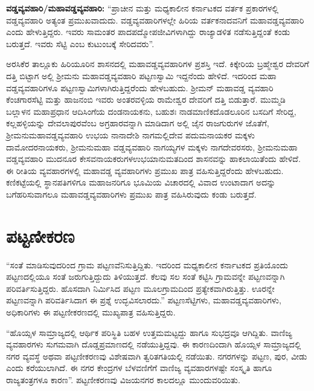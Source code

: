 \textbf{ವಡ್ಡವ್ಯವಹಾರಿ/ಮಹಾವಡ್ಡವ್ಯವಹಾರಿ:} “ಪ್ರಾಚೀನ ಮತ್ತು ಮಧ್ಯಕಾಲೀನ ಕರ್ನಾಟಕದ ವರ್ತಕ ಪ್ರಕಾರಗಳಲ್ಲಿ ವಡ್ಡವ್ಯವಹಾರಿ ಅತ್ಯಂತ ಪ್ರಮುಖವಾದುದು. ವಡ್ಡವ್ಯವಹಾರಿಗಳಲ್ಲೇ ಹಿರಿಯ ವರ್ತಕನಾದವನಿಗೆ ಮಹಾವಡ್ಡವ್ಯವಹಾರಿ ಎಂದು ಹೇಳುತ್ತಿದ್ದರು. ಇವರು ಸಾಮಂತರ ಪಾದಪದ್ಮೋಪಜೀವಿಗಳಾಗಿದ್ದು ರಾಜ್ಯಾಡಳಿತ ನಡೆಸುತ್ತಿದ್ದಂತೆ ಕಂಡು ಬರುತ್ತದೆ. ಇವರು ಸೆಟ್ಟಿ ಎಂಬ ಕುಟುಂಬಕ್ಕೆ ಸೇರಿದವರು”.

ಅರಸಿಕೆರ ತಾಲ್ಲೂಕು ಹಿರಿಯೂರಿನ ಶಾಸನದಲ್ಲಿ ಮಹಾವಡ್ಡವ್ಯವಹಾರಿಗಳ ಪ್ರಶಸ್ತಿ ಇದೆ. ಕಿಕ್ಕೇರಿಯ ಬ್ರಹ್ಮೇಶ್ವರ ದೇವರಿಗೆ ದತ್ತಿ ಬಿಟ್ಟಾಗ ಅಲ್ಲಿ ಶ‍್ರೀಮನು ಮಹಾವಡ್ಡವ್ಯವಹಾರಿ ಪಟ್ಟಣಸ್ವಾಮಿ ಇದ್ದನೆಂದು ಹೇಳಿದೆ. ಇದರಿಂದ ಮಹಾ ವಡ್ಡವ್ಯವಹಾರಿಗಳೂ ಪಟ್ಟಣಸ್ವಾಮಿಗಳಾಗಿರುತ್ತಿದ್ದರೆಂದು ಹೇಳಬಹುದು. ಶ‍್ರೀಮನ್​ ಮಹಾವಡ್ಡ ವ್ಯವಹಾರಿ ಕೆಂಚಗಾರಸೆಟ್ಟಿ ಮತ್ತು ಹಾಜನಂಬಿ ಇವರು ಅಂತರವಳ್ಳಿಯ ರಾಮೇಶ್ವರ ದೇವರಿಗೆ ದತ್ತಿ ಬಿಡುತ್ತಾರೆ. ಮುಮ್ಮಡಿ ಬಲ್ಲಾಳನ ಮಹಾಪ್ರಧಾನ ಆದಿಸಿಂಗೆಯ ದಂಡನಾಯಕನು, ಬಹುಶಃ ನಾಡಮಾಣಿಕದೊಡಲೂರಿನ ಬಸದಿಗೆ ಸೇರಿದ್ದ, ಕಲ್ಲಹಳ್ಳಿಯನ್ನು ದೇವಲಾಪುರವೆಂಬ ಅಗ್ರಹಾರವನ್ನಾಗಿ ಮಾಡಿದಾಗ ಅಲ್ಲಿ ಜೈನ ರಾಜಗುರುಗಳ ಜೊತೆಗೆ, ಶ‍್ರೀಮನುಮಹಾವಡ್ಡವ್ಯವಹಾರಿ ಉಭಯ ನಾನಾದೇಶಿ ನಾಗಮಲ್ಲಿದೇವ ಪದುಮನಾಯಕರ ಮಕ್ಕಳು ದಾಮೋದರನಾಯಕರು, ಶ‍್ರೀಮನುಮಹಾ ವಡ್ಡವ್ಯವಹಾರಿ ನಾಗಯ್ಯಗಳ ಮಕ್ಕಳು ನಾಗದೇವರಸರು, ಶ‍್ರೀಮನುಮಹಾ ವಡ್ಡವ್ಯವಹಾರಿ ಮುದನೂರ ಕೇಸವನಾಯಕರುಗಳ\break ಉಭಯಾನುಮತದಿಂದ ಶಾಸನವನ್ನು ಹಾಕಲಾಯಿತೆಂದು ಹೇಳಿದೆ. ಈ ರೀತಿಯ ವ್ಯವಹಾರಗಳಲ್ಲಿ ಮಹಾವಡ್ಡ ವ್ಯವಹಾರಿಗಳು ಪ್ರಮುಖ ಪಾತ್ರ ವಹಿಸುತ್ತಿದ್ದರೆಂದು ಹೇಳಬಹುದು. ಕಣಿಕಟ್ಟೆಯಲ್ಲಿ ಸ್ಥಾನಪತಿಗಳಿಗೂ ಮಹಾಜನರಿಗೂ ಭೂಮಿಯ ವಿಚಾರದಲ್ಲಿ ವಿವಾದ ಉಂಟಾದಾಗ ಅದನ್ನು ಬಗೆಹರಿಸುವಾಗಲೂ ಮಹಾವಡ್ಡವ್ಯವಹಾರಿಗಳು ಪ್ರಮುಖ ಪಾತ್ರ ವಹಿಸಿರುವುದು ಕಂಡು ಬರುತ್ತದೆ.


\section{ಪಟ್ಟಣೀಕರಣ}

“ಸಂತೆ ಮಾಡಿಸುವುದರಿಂದ ಗ್ರಾಮ ಪಟ್ಟಣವೆನಿಸುತ್ತಿದ್ದಿತು. ಇದರಿಂದ ಮಧ್ಯಕಾಲೀನ ಕರ್ನಾಟಕದ ಪ್ರತಿಯೊಂದು ಪಟ್ಟಣದಲ್ಲಿಯೂ ಸಂತೆ ಜರುಗುತ್ತಿದ್ದುದು ತಿಳಿಯುತ್ತದೆ. ಕೆಲವು ಸಲ ಸಂತೆ ಕಟ್ಟಿಸಿ ಗ್ರಾಮವನ್ನೇ ಪಟ್ಟಣವನ್ನಾಗಿ ಪರಿವರ್ತಿಸು\-ತ್ತಿದ್ದರು. ಹೊಸದಾಗಿ ನಿರ್ಮಿಸಿದ ಪಟ್ಟಣ ಮೂಲಗ್ರಾಮದಿಂದ ಪ್ರತ್ಯೇಕವಾಗಿರುತ್ತಿತ್ತು. ಊರನ್ನೇ ಪಟ್ಟಣವನ್ನಾಗಿ ಪರಿವರ್ತಿಸಿದಾಗ ಈ ಪ್ರಶ್ನೆ ಉದ್ಭವಿಸಲಾರದು.” ಪಟ್ಟಣಸೆಟ್ಟಿಗಳು, ಮಹಾವಡ್ಡವ್ಯವಹಾರಿಗಳು, ಅಧಿಕಾರಿಗಳು ಈ ಪಟ್ಟಣೀಕರಣದಲ್ಲಿ ಮುಖ್ಯಪಾತ್ರ ವಹಿಸುತ್ತಿದ್ದರು.

“ಹೊಯ್ಸಳ ಸಾಮ್ರಾಜ್ಯದಲ್ಲಿ ಆರ್ಥಿಕ ಪರಿಸ್ಥಿತಿ ಬಹಳ ಉತ್ತಮಮಟ್ಟದ್ದು ಹಾಗೂ ಸುಭದ್ರವೂ ಆಗಿದ್ದಿತು. ವಾಣಿಜ್ಯ ವ್ಯವಹಾರಗಳು ಸುಗಮವಾಗಿ ದೊಡ್ಡಪ್ರಮಾಣದಲ್ಲಿ ನಡೆಯುತ್ತಿದ್ದವು. ಈ ಕಾರಣದಿಂದಾಗಿ ಹೊಯ್ಸಳ ಸಾಮ್ರಾಜ್ಯದಲ್ಲಿ ನಗರ ವ್ಯವಸ್ಥೆ ಅಥವಾ ಪಟ್ಟಣೀಕರಣವು ವಿಶೇಷವಾಗಿ ತ್ವರಿತಗತಿಯಲ್ಲಿ ನಡೆಯಿತು. ನಗರಗಳನ್ನು ಪಟ್ಟಣ, ಪುರ, ವೀಡು ಎಂದು ಕರೆಯುಲಾಗಿದೆ. ಈ ನಗರ ಕೇಂದ್ರಗಳ ಬೆಳವಣಿಗೆಗೆ ವಾಣಿಜ್ಯ ವ್ಯವಹಾರಗಳಷ್ಟೇ ಸಂಸ್ಕೃತಿ ಹಾಗೂ ರಾಜ್ಯತಂತ್ರಗಳೂ ಕಾರಣ”. ಪಟ್ಟಣೀಕರಣವು ವಿಜಯನಗರ ಕಾಲದಲ್ಲೂ ಮುಂದುವರಿಯಿತು.

